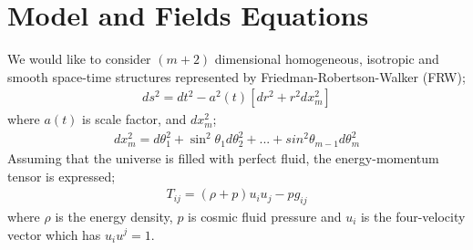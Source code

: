\documentclass[superscriptaddress,showpacs,pre,twocolumn]{revtex4-1}
\begin{document}
\section{Model and Fields Equations}

We would like to consider $(m + 2)$ dimensional homogeneous, isotropic and smooth space-time structures represented by Friedman-Robertson-Walker (FRW);
\begin{eqnarray} \label{FE-ds}
ds^{2} = dt^{2}-a^{2}(t) \left[dr^{2} + r^{2} dx^{2}_{m}  \right] 
\end{eqnarray}
where $a(t)$ is scale factor, and $dx^{2}_{m}$;
\begin{eqnarray} \label{FE-dx}
dx^{2}_{m} = d\theta^{2}_{1} + \sin^{2}\theta_{1} d\theta^{2}_{2}+...+ sin^{2}\theta_{m-1} d\theta^{2}_{m}
\end{eqnarray} 
Assuming that the universe is filled with perfect fluid, the energy-momentum tensor is expressed;
\begin{eqnarray} \label{FE-Tij}
T_{ij} = (\rho + p) u_{i} u_{j} - p g_{ij}
\end{eqnarray}
where $\rho$ is the energy density, $p$ is cosmic fluid pressure and $u_{i}$ is the four-velocity vector which has $u_{i}u^{j}=1$.
\end{document}
